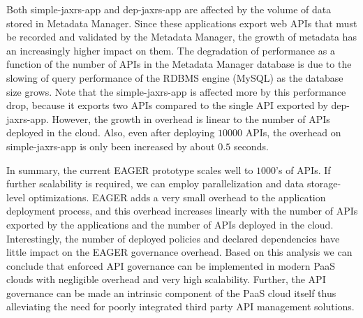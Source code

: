 Both simple-jaxrs-app and dep-jaxrs-app are
affected by the volume of data stored in Metadata Manager. Since these applications 
export web APIs that must be recorded and validated by the Metadata Manager, 
the growth of metadata has an increasingly higher impact on them. 
The degradation 
of performance as a function of the number of APIs in the Metadata Manager
database is due to the slowing of query performance of the RDBMS engine (MySQL) 
as the database size grows. Note that the simple-jaxrs-app
is affected more by this performance drop, because it exports two APIs compared to the single API exported 
by dep-jaxrs-app. However, the growth
in overhead is linear to the number of APIs deployed in the cloud. Also,
even after deploying $10000$ APIs, the overhead on simple-jaxrs-app is only been increased by 
about $0.5$ seconds.

In summary, the current EAGER prototype scales well to $1000$'s of APIs.
If further scalability is required, we can employ
parallelization and data storage-level optimizations.
EAGER adds a very small overhead to the application deployment
process, and 
this overhead increases linearly with the number of APIs exported by the applications
and the number of APIs deployed in the cloud. 
Interestingly, the number of deployed policies and declared dependencies
have little impact on the EAGER governance overhead. Based on this analysis we
can conclude that enforced API governance can be implemented in modern PaaS
clouds with negligible overhead and very high scalability. Further, the API governance
can be made an intrinsic component of the PaaS cloud itself thus alleviating the need
for poorly integrated third party API management solutions.